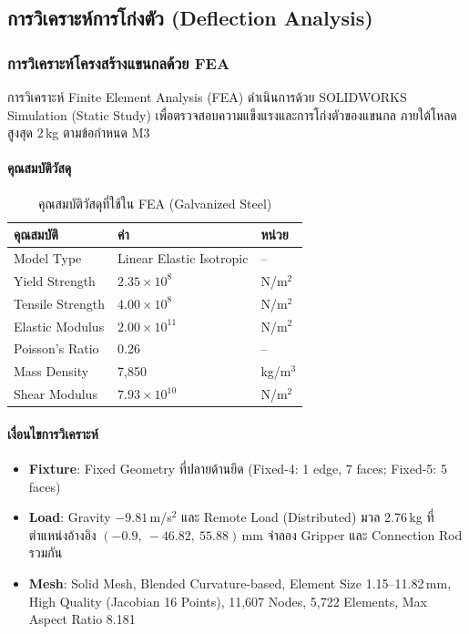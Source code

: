 \subsection{การวิเคราะห์การโก่งตัว (Deflection Analysis)}
\label{subsec:deflection}

\subsubsection{การวิเคราะห์โครงสร้างแขนกลด้วย FEA}
\label{subsubsec:arm_fea_analysis}

การวิเคราะห์ Finite Element Analysis (FEA)
ดำเนินการด้วย SOLIDWORKS Simulation (Static Study)
เพื่อตรวจสอบความแข็งแรงและการโก่งตัวของแขนกล
ภายใต้โหลดสูงสุด 2\,kg ตามข้อกำหนด M3

\paragraph{คุณสมบัติวัสดุ}

\begin{table}[H]
  \centering
  \caption{คุณสมบัติวัสดุที่ใช้ใน FEA (Galvanized Steel)}
  \label{tab:fea_material}
  \begin{tabular}{lll}
    \toprule
    คุณสมบัติ & ค่า & หน่วย \\
    \midrule
    Model Type        & Linear Elastic Isotropic & -- \\
    Yield Strength    & $2.35 \times 10^{8}$     & N/m$^2$ \\
    Tensile Strength  & $4.00 \times 10^{8}$     & N/m$^2$ \\
    Elastic Modulus   & $2.00 \times 10^{11}$    & N/m$^2$ \\
    Poisson's Ratio   & 0.26                     & -- \\
    Mass Density      & 7,850                    & kg/m$^3$ \\
    Shear Modulus     & $7.93 \times 10^{10}$    & N/m$^2$ \\
    \bottomrule
  \end{tabular}
\end{table}

\paragraph{เงื่อนไขการวิเคราะห์}

\begin{itemize}
  \item \textbf{Fixture}: Fixed Geometry ที่ปลายด้านยึด
        (Fixed-4: 1 edge, 7 faces;
         Fixed-5: 5 faces)
  \item \textbf{Load}: Gravity $-9.81$\,m/s$^2$
        และ Remote Load (Distributed) มวล 2.76\,kg
        ที่ตำแหน่งอ้างอิง
        $(-0.9,\ -46.82,\ 55.88)$\,mm
        จำลอง Gripper และ Connection Rod รวมกัน
  \item \textbf{Mesh}: Solid Mesh,
        Blended Curvature-based,
        Element Size 1.15--11.82\,mm,
        High Quality (Jacobian 16 Points),
        11,607 Nodes, 5,722 Elements,
        Max Aspect Ratio 8.181
\end{itemize}

